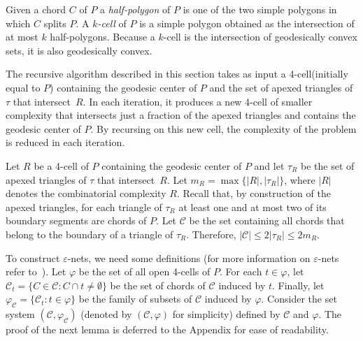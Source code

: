 \documentclass[a4paper,UKenglish]{lipics}
\newcommand{\F}[2]{\ensuremath{F_{\scriptscriptstyle #1}(#2)}}
\newcommand{\ff}[1]{\ensuremath{f(#1)}}
\newcommand{\m}{\ensuremath{m_{\scriptscriptstyle R}}}
\newcommand{\tcell}{4-cell\xspace}
\newcommand{\tcells}{4-cells\xspace}
\begin{document}


Given a chord $C$ of $P$ a \emph{half-polygon} of $P$ is one of the two simple polygons in which $C$ splits $P$.
A \emph{$k$-cell} of $P$ is a simple polygon obtained as the intersection of at most $k$ half-polygons.
Because a $k$-cell is the intersection of geodesically convex sets, it is also geodesically convex. 

The recursive algorithm described in this section takes as input a \tcell (initially equal to $P$) containing the geodesic center of $P$ and the set of apexed triangles of $\tau$ that intersect~$R$. In each iteration, it produces a new \tcell of smaller complexity that intersects just a fraction of the apexed triangles and contains the geodesic center of $P$. By recursing on this new cell, the complexity of the problem is reduced in each iteration.

Let $R$ be a \tcell of $P$ containing the geodesic center of $P$ and let $\tau_R$ be the set of apexed triangles of $\tau$ that intersect~$R$. 
Let $\m = \max\{|R|, |\tau_R|\}$, where $|R|$ denotes the combinatorial complexity $R$.
Recall that, by construction of the apexed triangles, for each triangle of $\tau_R$ at least one and at most two of its boundary segments are chords of $P$.
Let $\mathcal C$ be the set containing all chords that belong to the boundary of a triangle of $\tau_R$. 
Therefore, $|\mathcal C| \leq 2|\tau_R|\leq 2\m$.

To construct $\varepsilon$-nets, we need some definitions (for more information on $\varepsilon$-nets refer to~\cite{ConstructionEpsilonNets}).
Let $\varphi$ be the set of all open \tcells of $P$.
For each $t\in \varphi$, let $\mathcal C_t = \{C\in \mathcal C: C\cap t \neq \emptyset\}$ be the set of chords of $\mathcal C$ induced by $t$. 
Finally, let $\varphi_\mathcal C = \{\mathcal C_t : t\in \varphi\}$ be the family of subsets of $\mathcal C$ induced by $\varphi$.
Consider the set system $(\mathcal C, \varphi_\mathcal C)$ (denoted by $(\mathcal C, \varphi)$ for simplicity) defined by $\mathcal C$ and $\varphi$. 
The proof of the next lemma is deferred to the Appendix for ease of readability.
\end{document}
